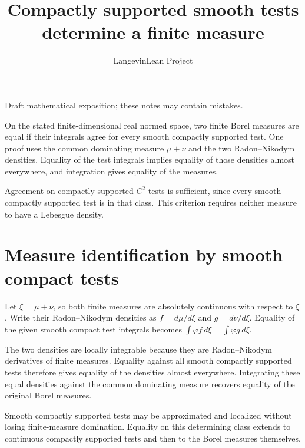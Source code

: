 \documentclass[11pt,a4paper]{article}
\title{\texorpdfstring{Compactly supported smooth tests determine a finite measure}{Compactly supported smooth tests determine a finite measure}}
\author{LangevinLean Project}
\date{}
\begin{document}
\maketitle
Draft mathematical exposition; these notes may contain mistakes.


On the stated finite-dimensional real normed space, two finite Borel measures are equal if their integrals agree for every smooth compactly supported test. One proof uses the common dominating measure \(\mu+\nu\) and the two Radon–Nikodym densities. Equality of the test integrals implies equality of those densities almost everywhere, and integration gives equality of the measures.



Agreement on compactly supported \(C^2\) tests is sufficient, since every smooth compactly supported test is in that class. This criterion requires neither measure to have a Lebesgue density.


\section{\texorpdfstring{Measure identification by smooth compact tests}{Measure identification by smooth compact tests}}


Let \(\xi=\mu+\nu\), so both finite measures are absolutely continuous with respect to \(\xi\). Write their Radon–Nikodym densities as \(f=d\mu/d\xi\) and \(g=d\nu/d\xi\). Equality of the given smooth compact test integrals becomes \(\int\varphi f\,d\xi=\int\varphi g\,d\xi\).



The two densities are locally integrable because they are Radon–Nikodym derivatives of finite measures. Equality against all smooth compactly supported tests therefore gives equality of the densities almost everywhere. Integrating these equal densities against the common dominating measure recovers equality of the original Borel measures.



Smooth compactly supported tests may be approximated and localized without losing finite-measure domination. Equality on this determining class extends to continuous compactly supported tests and then to the Borel measures themselves.
\end{document}
